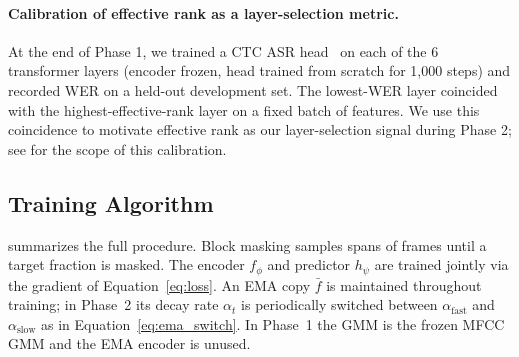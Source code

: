 \documentclass[9pt,twocolumn]{article}
\theoremstyle{plain}
\theoremstyle{definition}
\theoremstyle{remark}
\begin{document}
\paragraph{Calibration of effective rank as a layer-selection metric.}
At the end of Phase 1, we trained a CTC ASR head~\citep{graves2006ctc} on each of the 6 transformer layers (encoder frozen, head trained from scratch for 1{,}000 steps) and recorded WER on a held-out development set. The lowest-WER layer coincided with the highest-effective-rank layer on a fixed batch of features. We use this coincidence to motivate effective rank as our layer-selection signal during Phase 2; see  for the scope of this calibration.
\fi
\subsection{Training Algorithm}
\label{sec:algorithm}



 summarizes the full procedure. Block masking samples spans of frames until a target fraction is masked. The encoder $f_\phi$ and predictor $h_\psi$ are trained jointly via the gradient of Equation~\ref{eq:loss}. An EMA copy $\bar{f}$ is maintained throughout training; in Phase~2 its decay rate $\alpha_t$ is periodically switched between $\alpha_{\text{fast}}$ and $\alpha_{\text{slow}}$ as in Equation~\ref{eq:ema_switch}. In Phase~1 the GMM is the frozen MFCC GMM and the EMA encoder is unused.


\iffalse
\end{document}
